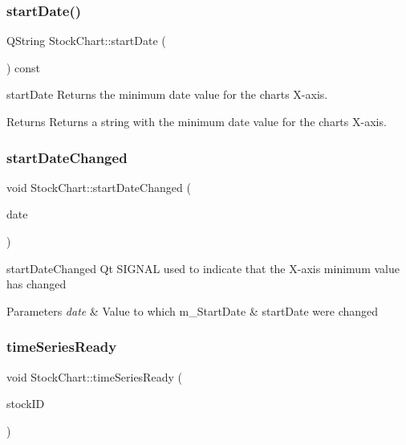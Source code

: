 \subsubsection{\texorpdfstring{start\+Date()}{startDate()}}
{\footnotesize\ttfamily Q\+String Stock\+Chart\+::start\+Date (\begin{DoxyParamCaption}{ }\end{DoxyParamCaption}) const}



start\+Date Returns the minimum date value for the chart\textquotesingle{}s X-\/axis. 

\begin{DoxyReturn}{Returns}
Returns a string with the minimum date value for the chart\textquotesingle{}s X-\/axis. 
\end{DoxyReturn}
\mbox{\label{class_stock_chart_a4f0cf491de4e546621bac94bec52abc2}} 
\subsubsection{\texorpdfstring{start\+Date\+Changed}{startDateChanged}}
{\footnotesize\ttfamily void Stock\+Chart\+::start\+Date\+Changed (\begin{DoxyParamCaption}\item[{const Q\+String \&}]{date }\end{DoxyParamCaption})\hspace{0.3cm}{\ttfamily [signal]}}



start\+Date\+Changed Qt S\+I\+G\+N\+AL used to indicate that the X-\/axis minimum value has changed 


\begin{DoxyParams}{Parameters}
{\em date} & Value to which m\+\_\+\+Start\+Date \& start\+Date were changed \\
\hline
\end{DoxyParams}
\mbox{\label{class_stock_chart_a9065188a2340a471d3db38fdd1763411}} 
\subsubsection{\texorpdfstring{time\+Series\+Ready}{timeSeriesReady}}
{\footnotesize\ttfamily void Stock\+Chart\+::time\+Series\+Ready (\begin{DoxyParamCaption}\item[{Q\+String}]{stock\+ID }\end{DoxyParamCaption})\hspace{0.3cm}{\ttfamily [signal]}}



